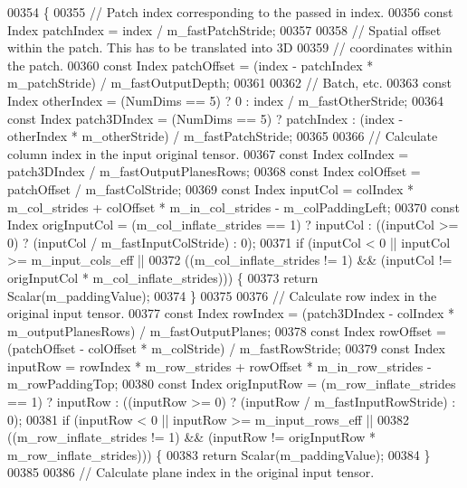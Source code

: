 \begin{DoxyCode}
00354 \textcolor{keyword}{  }\{
00355     \textcolor{comment}{// Patch index corresponding to the passed in index.}
00356     \textcolor{keyword}{const} Index patchIndex = index / m\_fastPatchStride;
00357 
00358     \textcolor{comment}{// Spatial offset within the patch. This has to be translated into 3D}
00359     \textcolor{comment}{// coordinates within the patch.}
00360     \textcolor{keyword}{const} Index patchOffset = (index - patchIndex * m\_patchStride) / m\_fastOutputDepth;
00361 
00362     \textcolor{comment}{// Batch, etc.}
00363     \textcolor{keyword}{const} Index otherIndex = (NumDims == 5) ? 0 : index / m\_fastOtherStride;
00364     \textcolor{keyword}{const} Index patch3DIndex = (NumDims == 5) ? patchIndex : (index - otherIndex * m\_otherStride) / 
      m\_fastPatchStride;
00365 
00366     \textcolor{comment}{// Calculate column index in the input original tensor.}
00367     \textcolor{keyword}{const} Index colIndex = patch3DIndex / m\_fastOutputPlanesRows;
00368     \textcolor{keyword}{const} Index colOffset = patchOffset / m\_fastColStride;
00369     \textcolor{keyword}{const} Index inputCol = colIndex * m\_col\_strides + colOffset * m\_in\_col\_strides - m\_colPaddingLeft;
00370     \textcolor{keyword}{const} Index origInputCol = (m\_col\_inflate\_strides == 1) ? inputCol : ((inputCol >= 0) ? (inputCol / 
      m\_fastInputColStride) : 0);
00371     \textcolor{keywordflow}{if} (inputCol < 0 || inputCol >= m\_input\_cols\_eff ||
00372         ((m\_col\_inflate\_strides != 1) && (inputCol != origInputCol * m\_col\_inflate\_strides))) \{
00373       \textcolor{keywordflow}{return} Scalar(m\_paddingValue);
00374     \}
00375 
00376     \textcolor{comment}{// Calculate row index in the original input tensor.}
00377     \textcolor{keyword}{const} Index rowIndex = (patch3DIndex - colIndex * m\_outputPlanesRows) / m\_fastOutputPlanes;
00378     \textcolor{keyword}{const} Index rowOffset = (patchOffset - colOffset * m\_colStride) / m\_fastRowStride;
00379     \textcolor{keyword}{const} Index inputRow = rowIndex * m\_row\_strides + rowOffset * m\_in\_row\_strides - m\_rowPaddingTop;
00380     \textcolor{keyword}{const} Index origInputRow = (m\_row\_inflate\_strides == 1) ? inputRow : ((inputRow >= 0) ? (inputRow / 
      m\_fastInputRowStride) : 0);
00381     \textcolor{keywordflow}{if} (inputRow < 0 || inputRow >= m\_input\_rows\_eff ||
00382         ((m\_row\_inflate\_strides != 1) && (inputRow != origInputRow * m\_row\_inflate\_strides))) \{
00383       \textcolor{keywordflow}{return} Scalar(m\_paddingValue);
00384     \}
00385 
00386     \textcolor{comment}{// Calculate plane index in the original input tensor.}

\end{DoxyCode}
